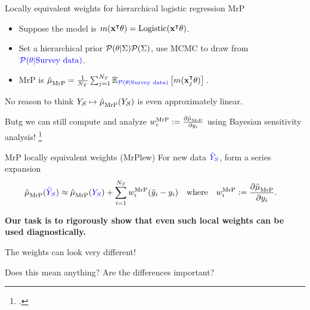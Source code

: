 \begin{frame}[t]{Locally equivalent weights for hierarchical logistic regression MrP}

\def\Y{\surcol{Y_S}}
\def\Ytil{\surcol{\tilde{Y}_S}}
%
\begin{itemize}
    \item Suppose the model is $m(\mathbf{x}^\intercal \theta) = \mathrm{Logistic}(\mathbf{x}^\intercal \theta)$.
    \item Set a hierarchical prior $\mathcal{P}(\theta \vert \Sigma)\mathcal{P}(\Sigma)$,
            use MCMC to draw from $\textcolor{blue}{\mathcal{P}(\theta \vert \textrm{Survey data})}$.
    \item MrP is $\hat{\mu}^{}_{\mathrm{MrP}} = \frac{1}{{N_T}} \sum_{j=1}^{N_T} \mathbb{E}_{\textcolor{blue}{\mathcal{P}(\theta \vert \textrm{Survey data})}}\left[ m(\mathbf{x}_j^\intercal \theta)\right]\,$.
\end{itemize}
%
No reason to think $Y_{\mathcal{S}} \mapsto \hat{\mu}^{}_{\mathrm{MrP}}(Y_{\mathcal{S}})$ is even approximately linear.

Butg we can still compute and analyze $w_i^{\mathrm{MrP}} := \frac{\partial \hat{\mu}^{}_{\mathrm{MrP}}}{\partial y_i}$
using Bayesian sensitivity analysis!
\footcite{gustafson:1996:localposterior,giordano:2018:covariances}

\pause
\begin{block}{MrP locally equivalent weights (MrPlew)}
\centering
\vspace{1em}
For new data $\Ytil$, form a series expansion
$$
\begin{aligned}
\muhat_\mrp(\Ytil) \approx{}& \muhat_\mrp(\Y) + \sumsur \w_i^\mrp (\ytil_i - \y_i)\quad
\textrm{where}\quad \w_i^\mrp :={} \frac{\partial \muhat_\mrp}{\partial \y_i}.
\end{aligned}
$$
\vspace{1em}
\end{block}
%
\pause
\textbf{
Our task is to rigorously show that even such local weights can be used
diagnostically.
}

%


\end{frame}




\begin{frame}{The weights can look very different!}

    \centering
    Does this mean anything?  Are the differences important?

    \WeightPlot{}
\end{frame}


